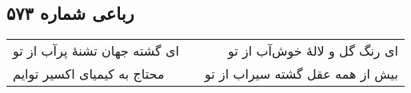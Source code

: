 \begin{center}
\section*{رباعی شماره ۵۷۳}
\label{sec:sh573}
\begin{longtable}{l p{0.5cm} r}
ای گشته جهان تشنهٔ پرآب از تو
&&
ای رنگ گل و لالهٔ خوش‌آب از تو
\\
محتاج به کیمیای اکسیر توایم
&&
بیش از همه عقل گشته سیراب از تو
\\
\end{longtable}
\end{center}
